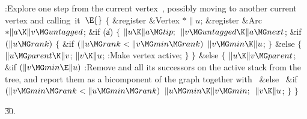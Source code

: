 \B{}:Explore one step from the current vertex~, possibly moving
to another current vertex and calling~it~\X${}\E{}$\6
${}\{{}$\5
\1\&{register} \&{Vertex} ${}{*}\|u{}$;\6
\&{register} \&{Arc} ${}{*}\|a\K\|v\MG\\{untagged}{}$;\7
\&{if} (\|a)\5
${}\{{}$\1\6
${}\|u\K\|a\MG\\{tip};{}$\6
${}\|v\MG\\{untagged}\K\|a\MG\\{next}{}$;\6
\&{if} ${}(\|u\MG\\{rank}){}$\5
${}\{{}$\1\6
\&{if} ${}(\|u\MG\\{rank}<\|v\MG\\{min}\MG\\{rank}){}$\1\5
${}\|v\MG\\{min}\K\|u{}$;\2%
\6
\4${}\}{}$\5
\2\&{else}\5
${}\{{}$\1\6
${}\|u\MG\\{parent}\K\|v{}$;\6
${}\|v\K\|u{}$;\6
:Make vertex  active\X;\6
\4${}\}{}$\2\6
\4${}\}{}$\5
\2\&{else}\5
${}\{{}$\1\6
${}\|u\K\|v\MG\\{parent}{}$;\6
\&{if} ${}(\|v\MG\\{min}\E\|u){}$\1\5
:Remove  and all its successors on the active stack from the tree,
and report them as a bicomponent of the graph together with~\X\2\6
\&{else}\6
\, \&{if} ${}(\|v\MG\\{min}\MG\\{rank}<\|u\MG\\{min}\MG\\{rank}){}$\1\5
${}\|u\MG\\{min}\K\|v\MG\\{min};{}$\2\6
${}\|v\K\|u{}$;\6
\4${}\}{}$\2\6
\4${}\}{}$\2\par
\U30.\fi

